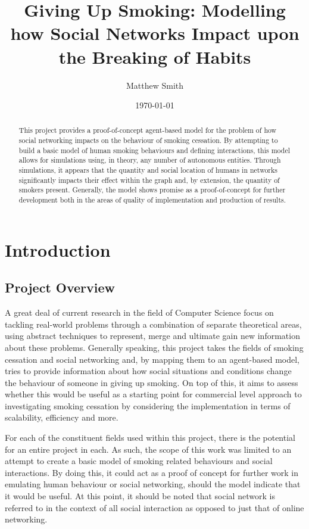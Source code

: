 \documentclass[]{report}
\begin{document}
\title{Giving Up Smoking: Modelling how Social Networks Impact upon the Breaking of Habits}
\author{Matthew Smith}
\date{\today}
\maketitle
\begin{abstract}
This project provides a proof-of-concept agent-based model for the problem of how social networking impacts on the behaviour of smoking cessation. By attempting to build a basic model of human smoking behaviours and defining interactions, this model allows for  simulations using, in theory, any number of autonomous entities. Through simulations, it appears that the quantity and social location of humans in networks significantly impacts their effect within the graph and, by extension, the quantity of smokers present. Generally, the model shows promise as a proof-of-concept for further development both in the areas of quality of implementation and production of results.
\end{abstract}

\tableofcontents

%
%
\chapter{Introduction}

\section{Project Overview}
A great deal of current research in the field of Computer Science focus on tackling real-world problems through a combination of separate theoretical areas, using abstract techniques to represent, merge and ultimate gain new information about these problems. Generally speaking, this project takes the fields of smoking cessation and social networking and, by mapping them to an agent-based model, tries to provide information about how social situations and conditions change the behaviour of someone in giving up smoking. On top of this, it aims to assess whether this would be useful as a starting point for commercial level approach to investigating smoking cessation by considering the implementation in terms of scalability, efficiency and more. 

For each of the constituent fields used within this project, there is the potential for an entire project in each. As such, the scope of this work was limited to an attempt to create a basic model of smoking related behaviours and social interactions. By doing this, it could act as a proof of concept for further work in emulating human behaviour or social networking, should the model indicate that it would be useful. At this point, it should be noted that social network is referred to in the context of all social interaction as opposed to just that of online networking. 
\end{document}
